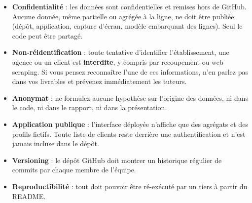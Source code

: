 \documentclass[11pt,a4paper]{article}
\providecommand{\tightlist}{\setlength{\itemsep}{0pt}\setlength{\parskip}{0pt}}
\begin{document}
\begin{itemize}
\tightlist
\item
  \textbf{Confidentialité} : les données sont confidentielles et remises
  hors de GitHub. Aucune donnée, même partielle ou agrégée à la ligne,
  ne doit être publiée (dépôt, application, capture d'écran, modèle
  embarquant des lignes). Seul le code peut être partagé.
\item
  \textbf{Non-réidentification} : toute tentative d'identifier
  l'établissement, une agence ou un client est \textbf{interdite}, y
  compris par recoupement ou web scraping. Si vous pensez reconnaître
  l'une de ces informations, n'en parlez pas dans vos livrables et
  prévenez immédiatement les tuteurs.
\item
  \textbf{Anonymat} : ne formulez aucune hypothèse sur l'origine des
  données, ni dans le code, ni dans le rapport, ni dans la présentation.
\item
  \textbf{Application publique} : l'interface déployée n'affiche que des
  agrégats et des profils fictifs. Toute liste de clients reste derrière
  une authentification et n'est jamais incluse dans le dépôt.
\item
  \textbf{Versioning} : le dépôt GitHub doit montrer un historique
  régulier de commits par chaque membre de l'équipe.
\item
  \textbf{Reproductibilité} : tout doit pouvoir être ré-exécuté par un
  tiers à partir du README.
\end{itemize}
\end{document}
